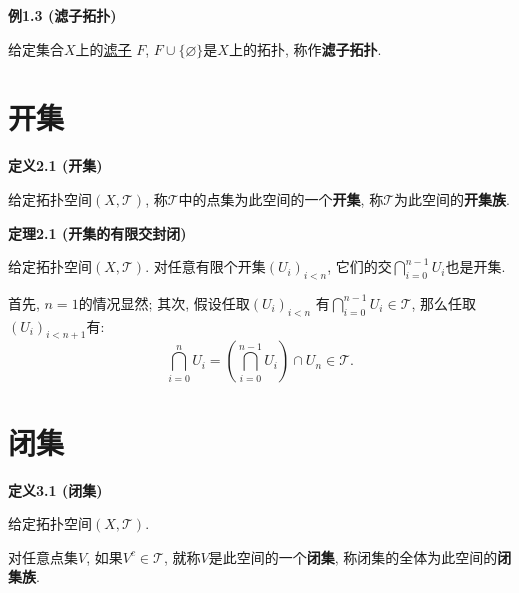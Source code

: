 \documentclass[UTF8]{ctexart}
\begin{document}
\hypertarget{sec:例1.3}{}
\noindent\textbf{例1.3 (滤子拓扑)}

给定集合$X$上的\href{../../01 基础集合论/06 滤子/01 滤子#nameddest=sec:定义1.1}{滤子}
$F$, $F\cup\{\varnothing\}$是$X$上的拓扑, 称作\textbf{滤子拓扑}.





\vspace{20pt}

\section{开集}

\hypertarget{sec:定义2.1}{}
\noindent\textbf{定义2.1 (开集)}

给定拓扑空间$(X,\mathcal{T})$, 称$\mathcal{T}$中的点集为此空间的一个\textbf{开集},
称$\mathcal{T}$为此空间的\textbf{开集族}.

\vspace{10pt}

\hypertarget{sec:定理2.1}{}
\noindent\textbf{定理2.1 (开集的有限交封闭)}

给定拓扑空间$(X,\mathcal{T})$. 对任意有限个开集$(U_i)_{i<n}$,
它们的交$\displaystyle\bigcap_{i=0}^{n-1}U_i$也是开集.


首先, $n=1$的情况显然; 其次, 假设任取$(U_i)_{i<n}$
有$\displaystyle\bigcap_{i=0}^{n-1}U_i\in\mathcal{T}$, 那么任取$(U_i)_{i<n+1}$有:
\vspace{3pt}
\begin{equation*}
    \bigcap_{i=0}^nU_i=\left(\bigcap_{i=0}^{n-1}U_i\right)\cap U_n\in\mathcal{T}.
\tag*{\qedsymbol}\end{equation*}





\newpage

\section{闭集}

\hypertarget{sec:定义3.1}{}
\noindent\textbf{定义3.1 (闭集)}

给定拓扑空间$(X,\mathcal{T})$.

对任意点集$V$, 如果$V^c\in\mathcal{T}$, 就称$V$是此空间的一个\textbf{闭集},
称闭集的全体为此空间的\textbf{闭集族}.

\vspace{10pt}
\end{document}
